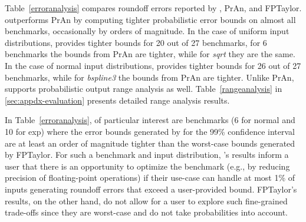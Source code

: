 Table~\ref{erroranalysis} compares roundoff errors reported by \Tool, PrAn, and
FPTaylor.
%
\Tool outperforms PrAn by computing tighter probabilistic error bounds on
almost all benchmarks, occasionally by orders of magnitude.
%
In the case of uniform input distributions, \Tool provides tighter bounds for
20 out of 27 benchmarks, for 6 benchmarks the bounds from PrAn are tighter,
while for \emph{sqrt} they are the same.
%
In the case of normal input distributions, \Tool provides tighter bounds for 26
out of 27 benchmarks, while for \emph{bspline3} the bounds from PrAn are
tighter.
%
%
Unlike PrAn, \Tool supports probabilistic output range analysis as well.
%
Table~\ref{rangeanalysis} in \cref{sec:appdx-evaluation} presents detailed
range analysis results.


In Table~\ref{erroranalysis}, of particular interest are benchmarks (6 for
normal and 10 for exp) where the error bounds generated by \Tool for the 99\%
confidence interval are at least an order of magnitude tighter than the
worst-case bounds generated by FPTaylor.
%
For such a benchmark and input distribution, \Tool's results inform a user that
there is an opportunity to optimize the benchmark (e.g., by reducing precision
of floating-point operations) if their use-case can handle at most 1\% of
inputs generating roundoff errors that exceed a user-provided bound.
%
FPTaylor's results, on the other hand, do not allow for a user to explore such
fine-grained trade-offs since they are worst-case and do not take probabilities
into account.

